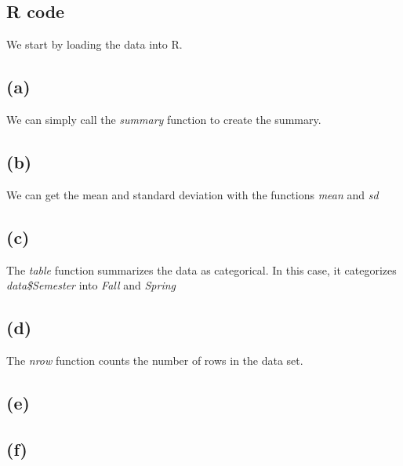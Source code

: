 \begin{appendices}
    \section{R code}
        We start by loading the data into R.


        \subsection*{(a)}

            We can simply call the \textit{summary} function to create the summary.


        \subsection*{(b)}

            We can get the mean and standard deviation with the functions \textit{mean} and \textit{sd}


        \subsection*{(c)}

            The \textit{table} function summarizes the data as categorical.
            In this case, it categorizes \textit{data\$Semester} into \textit{Fall} and \textit{Spring}


        \subsection*{(d)}

            The \textit{nrow} function counts the number of rows in the data set.


        \subsection*{(e)}


        \subsection*{(f)}


\end{appendices}
